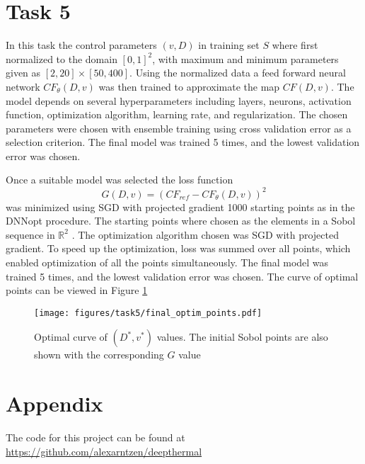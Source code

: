 \documentclass[a4paper]{article}
\newcommand{\R}{\mathbb{R}}
\begin{document}
\section*{Task 5}
In this task the control parameters $(v,D)$ in training set $S$ where first normalized to the domain $[0,1]^2$,  with maximum and minimum parameters given as $[2,20]\times[50,400]$. Using the normalized data a feed forward neural network $CF_{\theta}(D, v)$ was then trained to approximate the map $CF(D, v)$. The model depends on several hyperparameters including layers, neurons, activation function, optimization algorithm, learning rate, and regularization. The chosen parameters were chosen with ensemble training using cross validation error as a selection criterion.  The final model was trained 5 times, and the lowest validation error was chosen. 

Once a suitable model was selected the loss function
\begin{equation}
  G(D,v) = (CF_{ref}- CF_{\theta}(D,v))^2
\end{equation}
was minimized using SGD with projected gradient 1000 starting points as in the DNNopt\cite{Lye_2021} procedure. The starting points where chosen as the elements in a Sobol sequence in $\R^2$ . The optimization algorithm chosen was SGD with projected gradient. To speed up the optimization, loss was summed over all points, which enabled optimization of all the points simultaneously. The final model was trained 5 times, and the lowest validation error was chosen. The curve of optimal points can be viewed in Figure \ref{fig:task5}

\begin{figure}[t]
    \centering
    \texttt{[image: figures/task5/final\_optim\_points.pdf]}
    \caption{Optimal curve of $(D^*,v^*)$ values. The initial Sobol points are also shown with the corresponding $G$ value}
    \label{fig:task5}
\end{figure}

\section*{Appendix}
The code for this project can be found at \url{https://github.com/alexarntzen/deepthermal}

\FloatBarrier
\printbibliography
\end{document}
